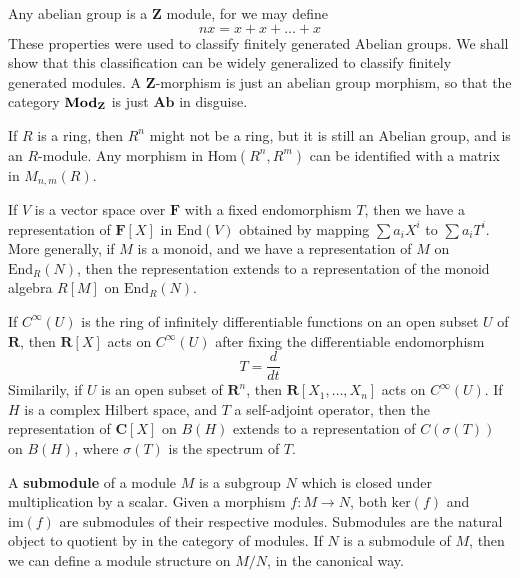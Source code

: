 \begin{example}
    Any abelian group is a $\mathbf{Z}$ module, for we may define
    \[ nx = x + x + \dots + x \]
    These properties were used to classify finitely generated Abelian groups. We shall show that this classification can be widely generalized to classify finitely generated modules. A $\mathbf{Z}$-morphism is just an abelian group morphism, so that the category $\text{{\bf Mod}}_\mathbf{Z}$ is just $\mathbf{Ab}$ in disguise.
\end{example}

\begin{example}
    If $R$ is a ring, then $R^n$ might not be a ring, but it is still an Abelian group, and is an $R$-module. Any morphism in $\text{Hom}(R^n, R^m)$ can be identified with a matrix in $M_{n,m}(R)$.
\end{example}

\begin{example}
    If $V$ is a vector space over $\mathbf{F}$ with a fixed endomorphism $T$, then we have a representation of $\mathbf{F}[X]$ in $\text{End}(V)$ obtained by mapping $\sum a_i X^i$ to $\sum a_i T^i$. More generally, if $M$ is a monoid, and we have a representation of $M$ on $\text{End}_R(N)$, then the representation extends to a representation of the monoid algebra $R[M]$ on $\text{End}_R(N)$.
\end{example}


\begin{example}
    If $C^\infty(U)$ is the ring of infinitely differentiable functions on an open subset $U$ of $\mathbf{R}$, then $\mathbf{R}[X]$ acts on $C^\infty(U)$ after fixing the differentiable endomorphism
    \[ T = \frac{d}{dt} \]
    Similarily, if $U$ is an open subset of $\mathbf{R}^n$, then $\mathbf{R}[X_1, \dots, X_n]$ acts on $C^\infty(U)$. If $H$ is a complex Hilbert space, and $T$ a self-adjoint operator, then the representation of $\mathbf{C}[X]$ on $B(H)$ extends to a representation of $C(\sigma(T))$ on $B(H)$, where $\sigma(T)$ is the spectrum of $T$.
\end{example}

A {\bf submodule} of a module $M$ is a subgroup $N$ which is closed under multiplication by a scalar. Given a morphism $f: M \to N$, both $\text{ker}(f)$ and $\text{im}(f)$ are submodules of their respective modules. Submodules are the natural object to quotient by in the category of modules. If $N$ is a submodule of $M$, then we can define a module structure on $M/N$, in the canonical way.

